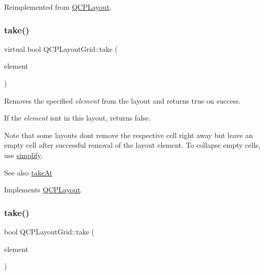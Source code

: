 Reimplemented from \hyperlink{class_q_c_p_layout_a41e6ac049143866e8f8b4964efab01b2}{Q\+C\+P\+Layout}.

\mbox{\label{class_q_c_p_layout_grid_a97b7dbaae963fc34bd7427318dab8861}} 
\subsubsection{\texorpdfstring{take()}{take()}\hspace{0.1cm}{\footnotesize\ttfamily [1/2]}}
{\footnotesize\ttfamily virtual bool Q\+C\+P\+Layout\+Grid\+::take (\begin{DoxyParamCaption}\item[{\hyperlink{class_q_c_p_layout_element}{Q\+C\+P\+Layout\+Element} $\ast$}]{element }\end{DoxyParamCaption})\hspace{0.3cm}{\ttfamily [virtual]}}

Removes the specified {\itshape element} from the layout and returns true on success.

If the {\itshape element} isn\textquotesingle{}t in this layout, returns false.

Note that some layouts don\textquotesingle{}t remove the respective cell right away but leave an empty cell after successful removal of the layout element. To collapse empty cells, use \hyperlink{class_q_c_p_layout_grid_a38621ca7aa633b6a9a88617df7f08672}{simplify}.

\begin{DoxySeeAlso}{See also}
\hyperlink{class_q_c_p_layout_grid_a17dd220234d1bbf8835abcc666384d45}{take\+At} 
\end{DoxySeeAlso}


Implements \hyperlink{class_q_c_p_layout_ada26cd17e56472b0b4d7fbbc96873e4c}{Q\+C\+P\+Layout}.

\mbox{\label{class_q_c_p_layout_grid_aee961c2eb6cf8a85dcbc5a7d7b6c1a00}} 
\subsubsection{\texorpdfstring{take()}{take()}\hspace{0.1cm}{\footnotesize\ttfamily [2/2]}}
{\footnotesize\ttfamily bool Q\+C\+P\+Layout\+Grid\+::take (\begin{DoxyParamCaption}\item[{\hyperlink{class_q_c_p_layout_element}{Q\+C\+P\+Layout\+Element} $\ast$}]{element }\end{DoxyParamCaption})\hspace{0.3cm}{\ttfamily [virtual]}}

